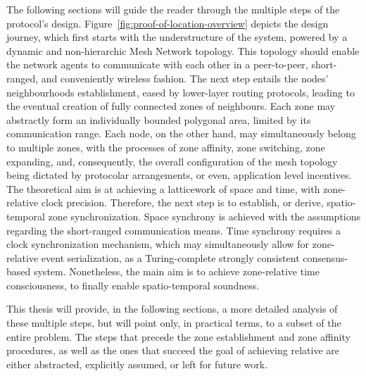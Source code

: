 The following sections will guide the reader through the multiple steps of the protocol's design. Figure~\ref{fig:proof-of-location-overview} depicts the design journey, which first starts with the understructure of the system, powered by a dynamic and non-hierarchic Mesh Network topology. This topology should enable the network agents to communicate with each other in a peer-to-peer, short-ranged, and conveniently wireless fashion. The next step entails the nodes' neighbourhoods establishment, eased by lower-layer routing protocols, leading to the eventual creation of fully connected zones of neighbours. Each zone may abstractly form an individually bounded polygonal area, limited by its communication range. Each node, on the other hand, may simultaneously belong to multiple zones, with the processes of zone affinity, zone switching, zone expanding, and, consequently, the overall configuration of the mesh topology being dictated by protocolar arrangements, or even, application level incentives. The theoretical aim is at achieving a latticework of space and time, with zone-relative clock precision. Therefore, the next step is to establish, or derive, spatio-temporal zone synchronization. Space synchrony is achieved with the assumptions regarding the short-ranged communication means. Time synchrony requires a clock synchronization mechanism, which may simultaneously allow for zone-relative event serialization, as a Turing-complete strongly consistent consensus-based system. Nonetheless, the main aim is to achieve zone-relative time consciousness, to finally enable spatio-temporal soundness.

This thesis will provide, in the following sections, a more detailed analysis of these multiple steps, but will point only, in practical terms, to a subset of the entire problem. The steps that precede the zone establishment and zone affinity procedures, as well as the ones that succeed the goal of achieving relative \pol{} are either abstracted, explicitly assumed, or left for future work.

